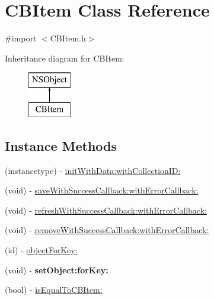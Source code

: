 \hypertarget{interface_c_b_item}{\section{C\+B\+Item Class Reference}
\label{interface_c_b_item}
}


{\ttfamily \#import $<$C\+B\+Item.\+h$>$}

Inheritance diagram for C\+B\+Item\+:\begin{figure}[H]
\begin{center}
\leavevmode
\includegraphics[height=2.000000cm]{interface_c_b_item}
\end{center}
\end{figure}
\subsection*{Instance Methods}
\begin{DoxyCompactItemize}
\item 
(instancetype) -\/ \hyperlink{interface_c_b_item_ace72b56932f3aa3b636800abdb50daa0}{init\+With\+Data\+:with\+Collection\+I\+D\+:}
\item 
(void) -\/ \hyperlink{interface_c_b_item_a35bde628ed02786ebcd145d74bea5ead}{save\+With\+Success\+Callback\+:with\+Error\+Callback\+:}
\item 
(void) -\/ \hyperlink{interface_c_b_item_acb4af198992cddea658fb099bbd81583}{refresh\+With\+Success\+Callback\+:with\+Error\+Callback\+:}
\item 
(void) -\/ \hyperlink{interface_c_b_item_acc375a79b97c2fcfaeda1c2737de51c0}{remove\+With\+Success\+Callback\+:with\+Error\+Callback\+:}
\item 
(id) -\/ \hyperlink{interface_c_b_item_aeb280c9120217ef525b1c47adb5db344}{object\+For\+Key\+:}
\item 
\hypertarget{interface_c_b_item_a850d0c9f26e8cd83ddec83458bc57df8}{(void) -\/ {\bfseries set\+Object\+:for\+Key\+:}}\label{interface_c_b_item_a850d0c9f26e8cd83ddec83458bc57df8}

\item 
(bool) -\/ \hyperlink{interface_c_b_item_ab47361f0044a8fd1893823b6ec95c46f}{is\+Equal\+To\+C\+B\+Item\+:}
\end{DoxyCompactItemize}
